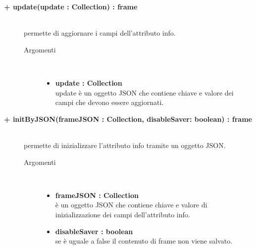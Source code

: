 \begin{description}
\begin{description}
\end{description}

\begin{description}
		\item[\textbf{\color{blue}+ update(update : Collection) : frame			}] \hfill \\
			permette di aggiornare i campi dell'attributo info.
			
		\begin{description}
			\item[Argomenti] \hfill \\
				\begin{itemize}
				
					\item \textbf{update : Collection			} \hfill \\
					update è un oggetto JSON che contiene chiave e valore dei campi che devono essere aggiornati. 
				\end{itemize}
		\end{description}

\end{description}

\begin{description}
		\item[\textbf{\color{blue}+ initByJSON(frameJSON : Collection, disableSaver: boolean) : frame			}] \hfill \\
			permette di inizializzare l'attributo info tramite un oggetto JSON. 
			
		\begin{description}
			\item[Argomenti] \hfill \\
				\begin{itemize}
				
					\item \textbf{frameJSON : Collection			} \hfill \\
					è un oggetto JSON che contiene chiave e valore di inizializzazione dei campi dell'attributo info. 
					\item \textbf{disableSaver : boolean			} \hfill \\
					se è uguale a false il contenuto di frame non viene salvato. %
				\end{itemize}
		\end{description}

\end{description}


\end{description}
